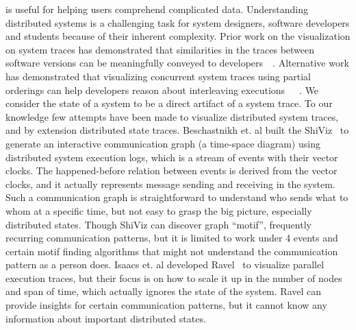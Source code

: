  is useful for helping users
comprehend complicated data.  Understanding distributed systems is a
challenging task for system designers, software developers and
students because of their inherent complexity.  Prior work on the
visualization on system traces has demonstrated that similarities in
the traces between software versions can be meaningfully conveyed to
developers~\cite{6613833}~\cite{Reynolds_detectingthe}. Alternative work has demonstrated that
visualizing concurrent system traces using partial orderings can help
developers reason about interleaving
executions~\cite{6650534}~\cite{7272586}~\cite{isaacs2014combing}. 
We consider the state of a
system to be a direct artifact of a system trace. 
To our knowledge few attempts have been made to visualize distributed system traces, 
and by extension distributed state traces.  
Beschastnikh et. al built the ShiViz~\cite{BeschastnikhWBE2016} to generate an
interactive communication graph (a time-space diagram) using distributed 
system execution logs, which is a stream of events with their vector clocks.
The happened-before relation between events is derived from the vector clocks,
and it actually represents message sending and receiving in the system.
Such a communication graph is straightforward to understand who sends what 
to whom at a specific time, but not easy to grasp the big picture, especially
distributed states.  
Though ShiViz can discover graph ``motif'', frequently recurring communication patterns,
but it is limited to work under 4 events and certain motif finding algorithms
that might not understand the communication pattern as a person does.
Isaacs et. al developed Ravel~\cite{isaacs2014combing}
to visualize parallel execution traces, but their focus is on how to 
scale it up in the number of nodes and span of time, which actually
ignores the state of the system.  Ravel can provide insights for 
certain communication patterns, but it cannot know any information
about important distributed states.


